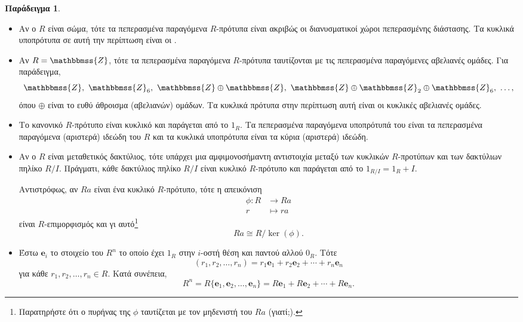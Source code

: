 \documentclass[12pt,a4paper,reqno]{amsart}
\theoremstyle{definition}
\newtheorem{example}[theorem]{Παράδειγμα}
\theoremstyle{remark}
\numberwithin{theorem}{section}
\numberwithin{exercise}{section}
\numberwithin{equation}{section}
\newcommand{\ZZ}{\mathbbmss{Z}}
\newcommand{\bfe}{\mathbf{e}}
\renewcommand{\to}{\rightarrow}
\begin{document}
\begin{example}
    \label{ex:generators_sum}
    \leavevmode
    \begin{itemize}
        \item[(α)] Αν ο $R$ είναι σώμα, τότε τα πεπερασμένα παραγόμενα $R$-πρότυπα είναι ακριβώς οι διανυσματικοί χώροι πεπερασμένης διάστασης. Τα κυκλικά υποπρότυπα σε αυτή την περίπτωση είναι οι .
        \item[(β)] Αν $R = \ZZ$, τότε τα πεπερασμένα παραγόμενα $R$-πρότυπα ταυτίζονται με τις πεπερασμένα παραγόμενες αβελιανές ομάδες. Για παράδειγμα, 
        \[
        \ZZ, \ \ZZ_6, \ \ZZ \oplus \ZZ, \ \ZZ \oplus \ZZ_2 \oplus \ZZ_6, \ \dots,
        \]
        όπου $\oplus$ είναι το ευθύ άθροισμα (αβελιανών) ομάδων. Τα κυκλικά πρότυπα στην περίπτωση αυτή είναι οι κυκλικές αβελιανές ομάδες.

        \item[(γ)] Το κανονικό $R$-πρότυπο είναι κυκλικό και παράγεται από το $1_R$. Τα πεπερασμένα παραγόμενα υποπρότυπά του είναι τα πεπερασμένα παραγόμενα (αριστερά) ιδεώδη του $R$ και τα κυκλικά υποπρότυπα είναι τα κύρια (αριστερά) ιδεώδη.
        
        \item[(δ)] Αν ο $R$ είναι μεταθετικός δακτύλιος, τότε υπάρχει μια αμφιμονοσήμαντη αντιστοιχία μεταξύ των κυκλικών $R$-προτύπων και των δακτύλιων πηλίκο $R/I$. Πράγματι, κάθε δακτύλιος πηλίκο $R/I$ είναι κυκλικό $R$-πρότυπο και παράγεται από το $1_{R/I} = 1_R + I$. 
        
        Αντιστρόφως, αν $Ra$ είναι ένα κυκλικό $R$-πρότυπο, τότε η απεικόνιση 
        \begin{align*}
            \phi : R &\to Ra \\ 
                   r &\mapsto ra 
        \end{align*}
        είναι $R$-επιμορφισμός και γι αυτό\footnote{Παρατηρήστε ότι ο πυρήνας της $\phi$ ταυτίζεται με τον μηδενιστή του $Ra$ (γιατί;).} 
        \[
        Ra \cong R/\ker(\phi). 
        \]

        \item[(ε)] Έστω $\bfe_i$ το στοιχείο του $R^n$ το οποίο έχει $1_R$ στην $i$-οστή θέση και παντού αλλού $0_R$. Τότε 
        \[
        (r_1, r_2, \dots, r_n) = r_1\bfe_1 + r_2\bfe_2 + \cdots + r_n\bfe_n
        \]
        για κάθε $r_1, r_2, \dots, r_n \in R$. Κατά συνέπεια,
        \[
        R^n = R\{\bfe_1, \bfe_2, \dots, \bfe_n\} = R\bfe_1 + R\bfe_2 + \cdots + R\bfe_n.
        \]


\end{itemize}
\end{example}
\end{document}
